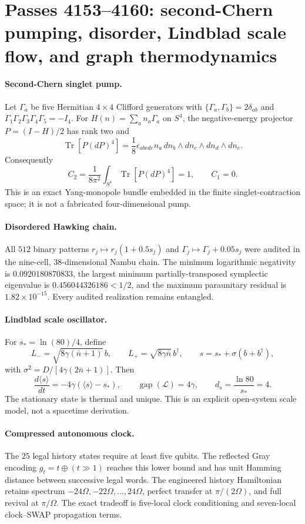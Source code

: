 \section{Passes 4153--4160: second-Chern pumping, disorder, Lindblad scale flow, and graph thermodynamics}
\label{sec:bt4153-4160}

\paragraph{Second-Chern singlet pump.}
Let $\Gamma_a$ be five Hermitian $4\times4$ Clifford generators with
$\{\Gamma_a,\Gamma_b\}=2\delta_{ab}$ and
$\Gamma_1\Gamma_2\Gamma_3\Gamma_4\Gamma_5=-I_4$.  For
$H(n)=\sum_an_a\Gamma_a$ on $S^4$, the negative-energy projector
$P=(I-H)/2$ has rank two and
\[
 \operatorname{Tr}[P(dP)^4]
 =\frac18\epsilon_{abcde}n_a\,dn_b\wedge dn_c\wedge dn_d\wedge dn_e.
\]
Consequently
\[
 C_2=\frac1{8\pi^2}\int_{S^4}\operatorname{Tr}[P(dP)^4]=1,
 \qquad C_1=0.
\]
This is an exact Yang-monopole bundle embedded in the finite singlet-contraction space; it is not a fabricated four-dimensional pump.

\paragraph{Disordered Hawking chain.}
All $512$ binary patterns
$r_j\mapsto r_j(1+0.5s_j)$ and
$\Gamma_j\mapsto\Gamma_j+0.05s_j$ were audited in the nine-cell,
$38$-dimensional Nambu chain.  The minimum logarithmic negativity is
$0.0920180870833$, the largest minimum partially-transposed symplectic
eigenvalue is $0.456044326186<1/2$, and the maximum paraunitary residual is
$1.82\times10^{-15}$.  Every audited realization remains entangled.

\paragraph{Lindblad scale oscillator.}
For $s_*=\ln(80)/4$, define
\[
 L_-=\sqrt{8\gamma(\bar n+1)}\,b,
 \qquad L_+=\sqrt{8\gamma\bar n}\,b^\dagger,
 \qquad s=s_*+\sigma(b+b^\dagger),
\]
with $\sigma^2=D/[4\gamma(2\bar n+1)]$.  Then
\[
 \frac{d\langle s\rangle}{dt}=-4\gamma(\langle s\rangle-s_*),
 \qquad \operatorname{gap}(\mathcal L)=4\gamma,
 \qquad d_s=\frac{\ln80}{s_*}=4.
\]
The stationary state is thermal and unique.  This is an explicit open-system scale model, not a spacetime derivation.

\paragraph{Compressed autonomous clock.}
The $25$ legal history states require at least five qubits.  The reflected
Gray encoding $g_t=t\oplus(t\!\gg\!1)$ reaches this lower bound and has
unit Hamming distance between successive legal words.  The engineered
history Hamiltonian retains spectrum $-24\Omega,-22\Omega,\ldots,24\Omega$,
perfect transfer at $\pi/(2\Omega)$, and full revival at $\pi/\Omega$.
The exact tradeoff is five-local clock conditioning and seven-local
clock--SWAP propagation terms.

